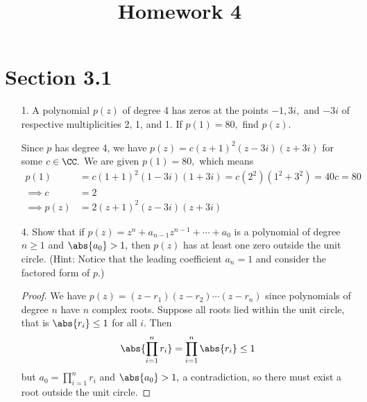 \documentclass{article}
\begin{document}
\title{Homework 4}
\maketitle
\thispagestyle{fancy}

\section*{Section 3.1}

\begin{itemize}
	\item[1.] A polynomial $p(z)$ of degree 4 has zeros at the points $-1, 3i,$ and $-3i$ of respective multiplicities 2, 1, and 1. If $p(1)=80,$ find $p(z).$
		\begin{soln}
			Since $p$ has degree 4, we have $p(z)=c(z+1)^2(z-3i)(z+3i)$ for some $c\in\CC.$ We are given $p(1)=80,$ which means
			\begin{align*}
				p(1) &= c(1+1)^2(1-3i)(1+3i) = c(2^2)(1^2+3^2) = 40c = 80 \\
				\implies c &= 2 \\
				\implies p(z) &= 2(z+1)^2(z-3i)(z+3i)
			\end{align*}
		\end{soln}

	\item[4.] Show that if $p(z)=z^n+a_{n-1}z^{n-1}+\cdots+a_0$ is a polynomial of degree $n\ge 1$ and $\abs{a_0}>1,$ then $p(z)$ has at least one zero outside the unit circle. (Hint: Notice that the leading coefficient $a_n=1$ and consider the factored form of $p.$)
		\begin{proof}
			We have $p(z)=(z-r_1)(z-r_2)\cdots (z-r_n)$ since polynomials of degree $n$ have $n$ complex roots. Suppose all roots lied within the unit circle, that is $\abs{r_i}\le 1$ for all $i.$ Then
			\begin{align*}
				\abs{\prod_{i=1}^{n} r_i} = \prod_{i=1}^{n} \abs{r_i} \le 1
			\end{align*}
			but $a_0=\prod_{i=1}^{n} r_i$ and $\abs{a_0}>1,$ a contradiction, so there must exist a root outside the unit circle.
		\end{proof}


\end{itemize}
\end{document}
